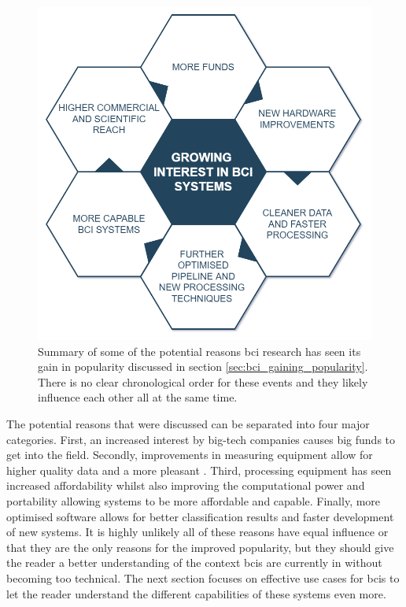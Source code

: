 \begin{figure}[ht]
    \centering
    \includegraphics[width=0.7\linewidth]{images/introduction/cyclic_interest_gain.png}
    \captionsetup{width=0.7\linewidth}
    \captionsetup{justification=centering}
    \caption{Summary of some of the potential reasons \gls{bci} research has seen its gain in popularity discussed in section \ref{sec:bci_gaining_popularity}. There is no clear chronological order for these events and they likely influence each other all at the same time.} 
    \label{fig:cyclic_popularity_increase}
\end{figure}

The potential reasons that were discussed can be separated into four major categories.
First, an increased interest by big-tech companies causes big funds to get into the field.
Secondly, improvements in measuring equipment allow for higher quality data and a more pleasant .
Third, processing equipment has seen increased affordability whilst also improving the computational power and portability allowing systems to be more affordable and capable.
Finally, more optimised software allows for better classification results and faster development of new systems.
It is highly unlikely all of these reasons have equal influence or that they are the only reasons for the improved popularity, but they should give the reader a better understanding of the context \glspl{bci} are currently in without becoming too technical.
The next section focuses on effective use cases for \glspl{bci} to let the reader understand the different capabilities of these systems even more.





